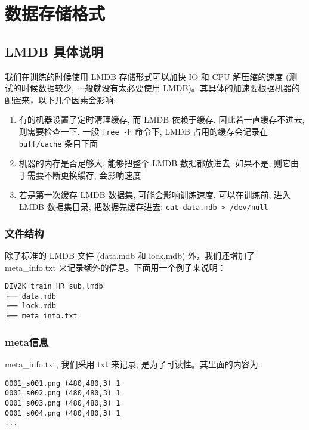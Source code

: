 \documentclass[../main.tex]{subfiles}
\begin{document}
\section{数据存储格式}\label{data_preparation:data_format}

\subsection{LMDB 具体说明}\label{data_preparation:lmdb}

我们在训练的时候使用 LMDB 存储形式可以加快 IO 和 CPU 解压缩的速度 (测试的时候数据较少, 一般就没有太必要使用 LMDB)。其具体的加速要根据机器的配置来，以下几个因素会影响:
\begin{enumerate}
    \item 有的机器设置了定时清理缓存, 而 LMDB 依赖于缓存. 因此若一直缓存不进去, 则需要检查一下. 一般 \texttt{free -h} 命令下, LMDB 占用的缓存会记录在 \texttt{buff/cache} 条目下面
    \item 机器的内存是否足够大, 能够把整个 LMDB 数据都放进去. 如果不是, 则它由于需要不断更换缓存, 会影响速度
    \item 若是第一次缓存 LMDB 数据集, 可能会影响训练速度. 可以在训练前, 进入 LMDB 数据集目录, 把数据先缓存进去: \texttt{cat data.mdb > /dev/null}
\end{enumerate}

\subsubsection{文件结构}

除了标准的 LMDB 文件 (data.mdb 和 lock.mdb) 外，我们还增加了 meta\_info.txt 来记录额外的信息。下面用一个例子来说明：

\begin{verbatim}
DIV2K_train_HR_sub.lmdb
├── data.mdb
├── lock.mdb
├── meta_info.txt
\end{verbatim}

\subsubsection{meta信息}

meta\_info.txt, 我们采用 txt 来记录, 是为了可读性。其里面的内容为:

\begin{verbatim}
0001_s001.png (480,480,3) 1
0001_s002.png (480,480,3) 1
0001_s003.png (480,480,3) 1
0001_s004.png (480,480,3) 1
...
\end{verbatim}
\end{document}
